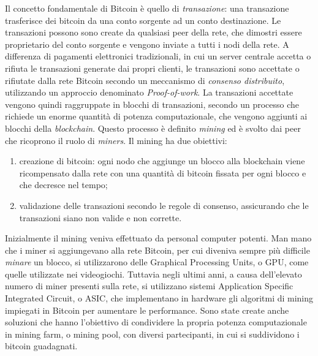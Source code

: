 Il concetto fondamentale di Bitcoin è quello di \emph{transazione}: una transazione trasferisce dei bitcoin da una conto sorgente ad un conto destinazione. Le transazioni possono sono create da qualsiasi peer della rete, che dimostri essere proprietario del conto sorgente e vengono inviate a tutti i nodi della rete. A differenza di pagamenti elettronici tradizionali, in cui un server centrale accetta o rifiuta le transazioni generate dai propri clienti, le transazioni sono accettate o rifiutate dalla rete Bitcoin secondo un meccanismo di \emph{consenso distribuito}, utilizzando un approccio denominato \emph{Proof-of-work}. La transazioni accettate vengono quindi raggruppate in blocchi di transazioni, secondo un processo che richiede un enorme quantità di potenza computazionale, che vengono aggiunti ai blocchi della \emph{blockchain}. Questo processo è definito \emph{mining} ed è svolto dai peer che ricoprono il ruolo di \emph{miners}. Il mining ha due obiettivi:
\begin{enumerate}
	\item creazione di bitcoin: ogni nodo che aggiunge un blocco alla blockchain viene ricompensato dalla rete con una quantità di bitcoin fissata per ogni blocco e che decresce nel tempo;
	\item validazione delle transazioni secondo le regole di consenso, assicurando che le transazioni siano non valide e non corrette.
\end{enumerate}
Inizialmente il mining veniva effettuato da personal computer potenti. Man mano che i miner si aggiungevano alla rete Bitcoin, per cui diveniva sempre più difficile \emph{minare} un blocco, si utilizzarono delle Graphical Processing Units, o GPU, come quelle utilizzate nei videogiochi. Tuttavia negli ultimi anni, a causa dell'elevato numero di miner presenti sulla rete, si utilizzano sistemi Application Specific Integrated Circuit, o ASIC, che implementano in hardware gli algoritmi di mining impiegati in Bitcoin per aumentare le performance. Sono state create anche soluzioni che hanno l'obiettivo di condividere la propria potenza computazionale in mining farm, o mining pool, con diversi partecipanti, in cui si suddividono i bitcoin guadagnati.

